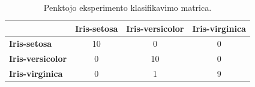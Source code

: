 \begin{table}[H]
    \centering
    \caption{Penktojo eksperimento klasifikavimo matrica.}
    \begin{tabular}{|l|c|c|c|}
        \hline
        & \textbf{Iris-setosa} & \textbf{Iris-versicolor} & \textbf{Iris-virginica} \\
        \hline
        \textbf{Iris-setosa} & 10 & 0 & 0 \\ \hline
        \textbf{Iris-versicolor} & 0 & 10 & 0 \\ \hline
        \textbf{Iris-virginica} & 0 & 1 & 9 \\ \hline
    \end{tabular}
    \label{tab:eksperimento_nr_5_klasifikavimo_matrica}
\end{table}